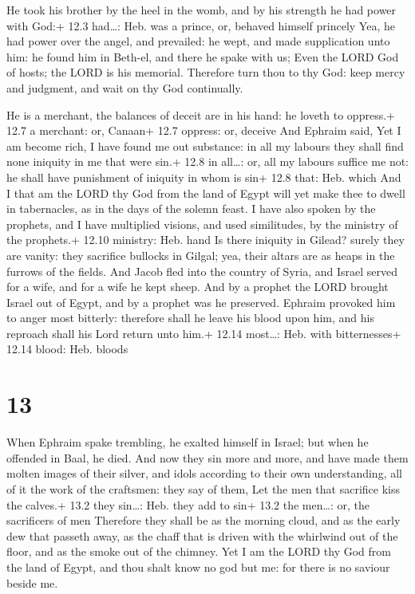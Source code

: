  He took his brother by the heel in the womb, and by his
strength he had power with God:+ 12.3 had\ldots: Heb. was a prince, or,
behaved himself princely  Yea, he had power over the angel,
and prevailed: he wept, and made supplication unto him: he found him in
Beth-el, and there he spake with us;  Even the LORD God of
hosts; the LORD is his memorial.  Therefore turn thou to thy
God: keep mercy and judgment, and wait on thy God continually.

 He is a merchant, the balances of deceit are in his hand:
he loveth to oppress.+ 12.7 a merchant: or, Canaan+ 12.7 oppress: or,
deceive  And Ephraim said, Yet I am become rich, I have
found me out substance: in all my labours they shall find none iniquity
in me that were sin.+ 12.8 in all\ldots: or, all my labours suffice me
not: he shall have punishment of iniquity in whom is sin+ 12.8 that:
Heb. which  And I that am the LORD thy God from the land of
Egypt will yet make thee to dwell in tabernacles, as in the days of the
solemn feast.  I have also spoken by the prophets, and I
have multiplied visions, and used similitudes, by the ministry of the
prophets.+ 12.10 ministry: Heb. hand  Is there iniquity in
Gilead? surely they are vanity: they sacrifice bullocks in Gilgal; yea,
their altars are as heaps in the furrows of the fields. 
And Jacob fled into the country of Syria, and Israel served for a wife,
and for a wife he kept sheep.  And by a prophet the LORD
brought Israel out of Egypt, and by a prophet was he preserved.
 Ephraim provoked him to anger most bitterly: therefore
shall he leave his blood upon him, and his reproach shall his Lord
return unto him.+ 12.14 most\ldots: Heb. with bitternesses+ 12.14 blood:
Heb. bloods

\hypertarget{section-12}{%
\section{13}\label{section-12}}

 When Ephraim spake trembling, he exalted himself in Israel;
but when he offended in Baal, he died.  And now they sin
more and more, and have made them molten images of their silver, and
idols according to their own understanding, all of it the work of the
craftsmen: they say of them, Let the men that sacrifice kiss the
calves.+ 13.2 they sin\ldots: Heb. they add to sin+ 13.2 the men\ldots:
or, the sacrificers of men  Therefore they shall be as the
morning cloud, and as the early dew that passeth away, as the chaff that
is driven with the whirlwind out of the floor, and as the smoke out of
the chimney.  Yet I am the LORD thy God from the land of
Egypt, and thou shalt know no god but me: for there is no saviour beside
me.

